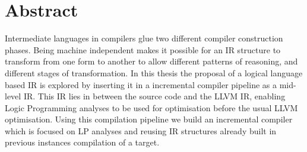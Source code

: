 \chapter{Abstract}

Intermediate languages in compilers glue two different compiler construction
phases. Being machine independent makes it possible for an IR structure to
transform from one form to another to allow different patterns of reasoning,
and different stages of transformation. In this thesis the proposal of a
logical language based IR is explored by inserting it in a incremental compiler
pipeline as a mid-level IR. This IR lies in between the source code and the
LLVM IR, enabling Logic Programming analyses to be used for optimisation before
the usual LLVM optimisation. Using this compilation pipeline we build an
incremental compiler which is focused on LP analyses and reusing IR structures
already built in previous instances compilation of a target.

